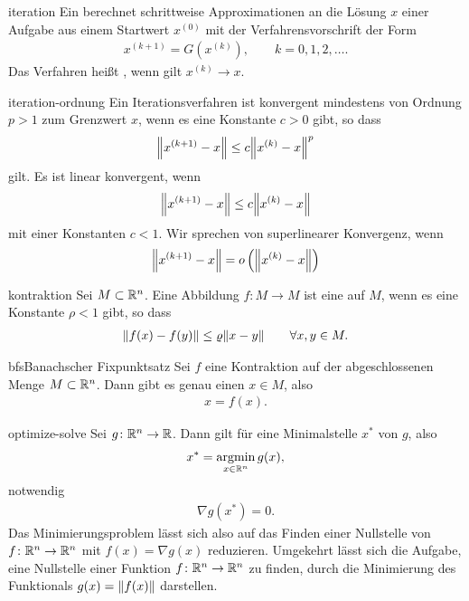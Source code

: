 \begin{Definition}{iteration}
  Ein  berechnet schrittweise
  Approximationen an die Lösung $x$ einer Aufgabe aus einem Startwert
  $x^{(0)}$ mit der Verfahrensvorschrift der Form
  \begin{gather}
    x^{(k+1)} = G(x^{(k)}), \qquad k=0,1,2,\dots.
  \end{gather}
  Das Verfahren heißt , wenn gilt $x^{(k)} \to x$.
\end{Definition}

\begin{Definition}{iteration-ordnung}
  Ein Iterationsverfahren
   ist konvergent
  mindestens von Ordnung $p>1$ zum Grenzwert $x$, wenn es eine
  Konstante $c>0$ gibt, so dass
  \begin{gather}
    \norm*{x^{(k+1)} - x} \le  c \norm*{x^{(k)} - x}^p
  \end{gather}
  gilt. Es ist linear konvergent, wenn
  \begin{gather}
    \norm*{x^{(k+1)} - x} \le  c \norm*{x^{(k)} - x}
  \end{gather}
  mit einer Konstanten $c<1$. Wir sprechen von superlinearer Konvergenz, wenn
  \begin{gather}
    \norm*{x^{(k+1)} - x} = \smallo\left(\norm*{x^{(k)} - x}\right)
  \end{gather}
\end{Definition}

\begin{Definition}{kontraktion}
  Sei $M\subset\R^n$. Eine Abbildung $f\colon M\to M$ ist eine  auf $M$, wenn es eine Konstante $\rho < 1$ gibt, so dass
  \begin{gather}
    \norm{f(x) - f(y)} \le \rho \norm{x-y} \qquad\forall x,y\in M.
  \end{gather}
\end{Definition}

\begin{Satz*}{bfs}{Banachscher Fixpunktsatz}
  Sei $f$ eine Kontraktion auf der abgeschlossenen Menge $M\subset\R^n$. Dann gibt es genau einen  $x\in M$, also
  \begin{gather}
    x = f(x).
  \end{gather}
\end{Satz*}

\begin{Satz}{optimize-solve}
  Sei $g\colon \R^n\to \R$. Dann gilt für eine Minimalstelle $x^*$ von $g$,
  also
  \begin{gather}
    x^* = \operatorname*{argmin}_{x\in\R^n} g(x),
  \end{gather}
  notwendig
  \begin{gather}
    \nabla g(x^*) = 0.
  \end{gather}
  Das Minimierungsproblem lässt sich also auf das Finden einer
  Nullstelle von $f\colon \R^n\to \R^n$ mit $f(x) = \nabla g(x)$
  reduzieren. Umgekehrt lässt sich die Aufgabe, eine Nullstelle einer
  Funktion $f\colon \R^n \to \R^n$ zu finden, durch die Minimierung
  des Funktionals $g(x) = \norm{f(x)}$ darstellen.
\end{Satz}

